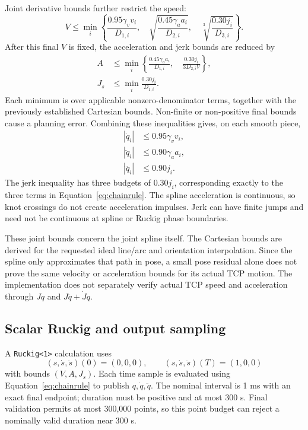 \documentclass[11pt,a4paper]{report}
\newcommand{\file}[1]{\nolinkurl{#1}}
\begin{document}
Joint derivative bounds further restrict the speed:
\begin{equation}
 V\le\min_i\left\{
 \frac{0.95\gamma_vv_i}{D_{1,i}},\quad
 \sqrt{\frac{0.45\gamma_aa_i}{D_{2,i}}},\quad
 \sqrt[3]{\frac{0.30j_i}{D_{3,i}}}\right\}.
 \label{eq:vbound}
\end{equation}
After this final $V$ is fixed, the acceleration and jerk bounds are reduced by
\begin{align}
 A&\le\min_i\left\{
 \frac{0.45\gamma_aa_i}{D_{1,i}},\quad
 \frac{0.30j_i}{3D_{2,i}V}\right\},\\
 J_s&\le\min_i\frac{0.30j_i}{D_{1,i}}.
 \label{eq:ajbound}
\end{align}
Each minimum is over applicable nonzero-denominator terms, together with the
previously established Cartesian bounds. Non-finite or non-positive final
bounds cause a planning error. Combining these inequalities gives, on each
smooth piece,
\begin{align}
 |\dot q_i|&\le0.95\gamma_vv_i,\\
 |\ddot q_i|&\le0.90\gamma_aa_i,\\
 |\dddot q_i|&\le0.90j_i.
\end{align}
The jerk inequality has three budgets of $0.30j_i$, corresponding exactly to
the three terms in Equation~\eqref{eq:chainrule}. The spline acceleration is
continuous, so knot crossings do not create acceleration impulses. Jerk can
have finite jumps and need not be continuous at spline or Ruckig phase boundaries.

These joint bounds concern the joint spline itself. The Cartesian bounds
are derived for the requested ideal line/arc and orientation interpolation.
Since the spline only approximates that path in pose, a small pose residual
alone does not prove the same velocity or acceleration bounds for its actual
TCP motion. The implementation does not separately verify actual TCP speed
and acceleration through $J\dot q$ and $J\ddot q+\dot J\dot q$.

\subsection{Scalar Ruckig and output sampling}
A \file{Ruckig<1>} calculation uses
\begin{equation}
 (s,\dot s,\ddot s)(0)=(0,0,0),\qquad
 (s,\dot s,\ddot s)(T)=(1,0,0)
\end{equation}
with bounds $(V,A,J_s)$. Each time sample is evaluated using
Equation~\eqref{eq:chainrule} to publish $q,\dot q,\ddot q$.
The nominal interval is 1 ms with an exact final endpoint; duration must be
positive and at most 300 s. Final validation permits at most 300,000 points,
so this point budget can reject a nominally valid duration near 300 s.
\end{document}
